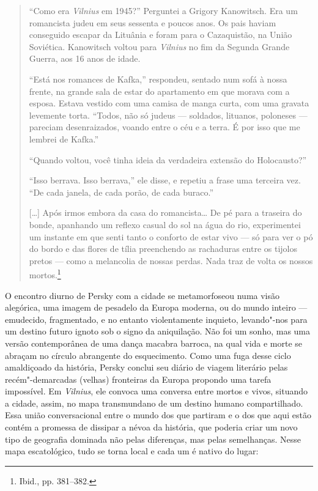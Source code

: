\begin{quote}
``Como era \textit{Vilnius} em 1945?'' Perguntei a Grigory Kanowitsch. Era um
romancista judeu em seus sessenta e poucos anos. Os pais haviam
conseguido escapar da Lituânia e foram para o Cazaquistão, na União
Soviética. Kanowitsch voltou para \textit{Vilnius} no fim da Segunda Grande
Guerra, aos 16 anos de idade.

``Está nos romances de Kafka,'' respondeu, sentado num sofá à nossa
frente, na grande sala de estar do apartamento em que morava com a
esposa. Estava vestido com uma camisa de manga curta, com uma gravata
levemente torta. ``Todos, não só judeus --- soldados, lituanos, poloneses
--- pareciam desenraizados, voando entre o céu e a terra. É por isso que
me lembrei de Kafka.''

``Quando voltou, você tinha ideia da verdadeira extensão do
Holocausto?''

``Isso berrava. Isso berrava,'' ele disse, e repetiu a frase uma
terceira vez. ``De cada janela, de cada porão, de cada buraco.''

[\ldots{}] Após irmos embora da casa do romancista\ldots{} De pé para a
traseira do bonde, apanhando um reflexo casual do sol na água do rio,
experimentei um instante em que senti tanto o conforto de estar vivo ---
só para ver o pó do bordo e das flores de tília preenchendo as
rachaduras entre os tijolos pretos --- como a melancolia de nossas perdas.
Nada traz de volta os nossos mortos.\footnote{Ibid., pp. 381--382.}
\end{quote}

O encontro diurno de Persky com a cidade se metamorfoseou numa visão
alegórica, uma imagem de pesadelo da Europa moderna, ou do mundo inteiro
--- emudecido, fragmentado, e no entanto violentamente inquieto,
levando"-nos para um destino futuro ignoto sob o signo da aniquilação.
Não foi um sonho, mas uma versão contemporânea de uma dança macabra
barroca, na qual vida e morte se abraçam no círculo abrangente do
esquecimento. Como uma fuga desse ciclo amaldiçoado da história, Persky
conclui seu diário de viagem literário pelas recém"-demarcadas (velhas)
fronteiras da Europa propondo uma tarefa impossível. Em \textit{Vilnius}, ele
convoca uma conversa entre mortos e vivos, situando a cidade, assim, no
mapa transmundano de um destino humano compartilhado. Essa união
conversacional entre o mundo dos que partiram e o dos que aqui estão
contém a promessa de dissipar a névoa da história, que poderia criar um
novo tipo de geografia dominada não pelas diferenças, mas pelas
semelhanças. Nesse mapa escatológico, tudo se torna local e cada um é
nativo do lugar:

